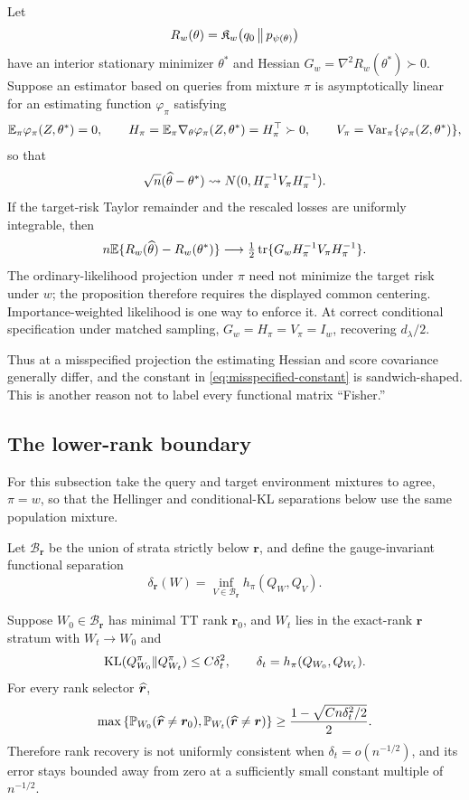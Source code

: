 \begin{proposition}
\label{prop:misspecified-constant}
Let
\[
R_w(\theta)=\mathfrak K_w\!\left(q_0\,\middle\|\,p_{\psi(\theta)}\right)
\]
have an interior stationary minimizer \(\theta^*\) and Hessian
\(G_w=\nabla^2R_w(\theta^*)\succ0\). Suppose an estimator based on queries
from mixture \(\pi\) is asymptotically linear for an estimating function
\(\varphi_\pi\) satisfying
\[
\mathbb E_\pi\varphi_\pi(Z,\theta^*)=0,\qquad
H_\pi=\mathbb E_\pi\nabla_\theta\varphi_\pi(Z,\theta^*)
=H_\pi^\top\succ0,\qquad
V_\pi=\operatorname{Var}_\pi\{\varphi_\pi(Z,\theta^*)\},
\]
so that
\[
\sqrt n(\widehat\theta-\theta^*)\rightsquigarrow
N(0,H_\pi^{-1}V_\pi H_\pi^{-1}).
\]
If the target-risk Taylor remainder and the rescaled losses are uniformly
integrable, then
\begin{equation}
n\mathbb E\{R_w(\widehat\theta)-R_w(\theta^*)\}
\longrightarrow
\tfrac12\operatorname{tr}\{G_wH_\pi^{-1}V_\pi H_\pi^{-1}\}.
\label{eq:misspecified-constant}
\end{equation}
The ordinary-likelihood projection under \(\pi\) need not minimize the target
risk under \(w\); the proposition therefore requires the displayed
common centering. Importance-weighted likelihood is one way to enforce it.
At correct conditional specification under matched sampling,
\(G_w=H_\pi=V_\pi=I_w\), recovering \(d_\lambda/2\).
\end{proposition}

Thus at a misspecified projection the estimating Hessian and score covariance
generally differ, and the constant in \cref{eq:misspecified-constant} is
sandwich-shaped. This is
another reason not to label every functional matrix ``Fisher.''

\subsection{The lower-rank boundary}

For this subsection take the query and target environment mixtures to agree,
\(\pi=w\), so that the Hellinger and conditional-KL separations below use the
same population mixture.

Let \(\mathcal B_{\bm r}\) be the union of strata strictly below \(\bm r\), and define the gauge-invariant functional separation
\[
\delta_{\bm r}(W)=\inf_{V\in\mathcal B_{\bm r}}
h_\pi(Q_W,Q_V).
\]

\begin{theorem}
\label{thm:rank-impossibility}
Suppose \(W_0\in\mathcal B_{\bm r}\) has minimal TT rank \(\bm r_0\), and
\(W_t\) lies in the exact-rank \(\bm r\) stratum with \(W_t\to W_0\) and
\[
\operatorname{KL}(Q_{W_0}^\pi\|Q_{W_t}^\pi)\le C\delta_t^2,
\qquad \delta_t=h_\pi(Q_{W_0},Q_{W_t}).
\]
For every rank selector \(\widehat{\bm r}\),
\[
\max\left\{
\mathbb P_{W_0}(\widehat{\bm r}\ne\bm r_0),
\mathbb P_{W_t}(\widehat{\bm r}\ne\bm r)
\right\}
\ge\frac{1-\sqrt{Cn\delta_t^2/2}}{2}.
\]
Therefore rank recovery is not uniformly consistent when \(\delta_t=o(n^{-1/2})\), and its error stays bounded away from zero at a sufficiently small constant multiple of \(n^{-1/2}\).
\end{theorem}

